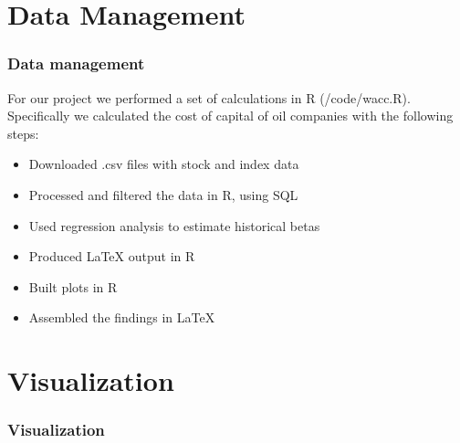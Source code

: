 \documentclass {beamer}
\begin{document}
\section{Data Management}
\begin{frame}
\frametitle{Data management}
For our project we performed a set of calculations in R (/code/wacc.R).\\
Specifically we calculated the cost of capital of oil companies with the following steps:
\begin{itemize}
\item Downloaded .csv files with stock and index data
\item Processed and filtered the data in R, using SQL
\item Used regression analysis to estimate historical betas
\item Produced LaTeX output in R
\item Built plots in R
\item Assembled the findings in LaTeX
\end{itemize}

\end{frame}

\section{Visualization}
\begin{frame}
\frametitle{Visualization}

\end{frame}
\end{document}
